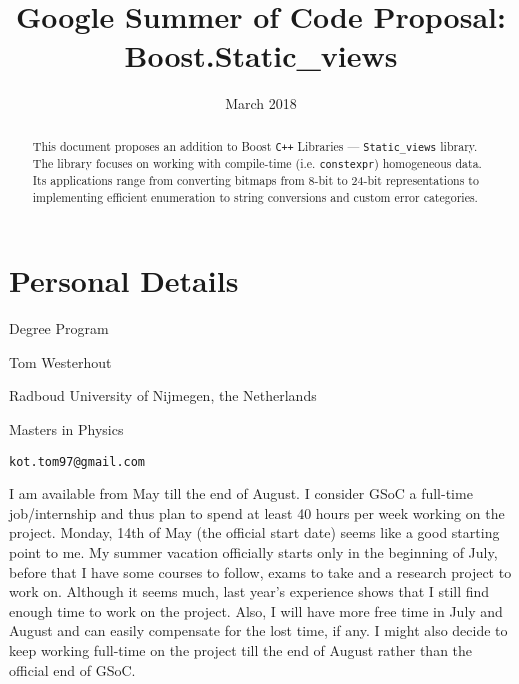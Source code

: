 \documentclass[a4paper,12pt]{article}
\title{Google Summer of Code Proposal: Boost.Static\_views}
\date{March 2018}
\begin{document}
\maketitle

\begin{abstract}
    This document proposes an addition to Boost \texttt{C++} Libraries ---
    \texttt{Static\_views} library. The library focuses on working with
    compile-time (i.e.  \texttt{constexpr}) homogeneous data. Its applications
    range from converting bitmaps from 8-bit to 24-bit representations to
    implementing efficient enumeration to string conversions and custom error
    categories.
\end{abstract}

\vspace{5cm}
\section*{Personal Details}
    \begin{labeling}{Degree Program}
    \item [Name] Tom Westerhout
    \item [University] Radboud University of Nijmegen, the Netherlands
    \item [Degree Program] Masters in Physics
    \item [Email] \texttt{kot.tom97@gmail.com}
    \item [Availability] I am available from May till the end of August. I
        consider GSoC a full-time job/internship and thus plan to spend at least
        40 hours per week working on the project. Monday, 14th of May (the
        official start date) seems like a good starting point to me. My summer
        vacation officially starts only in the beginning of July, before that I
        have some courses to follow, exams to take and a research project to
        work on. Although it seems much, last year's experience shows that I
        still find enough time to work on the project. Also, I will have more
        free time in July and August and can easily compensate for the lost
        time, if any. I might also decide to keep working full-time on the
        project till the end of August rather than the official end of GSoC.
    \end{labeling}

\newpage
\end{document}
